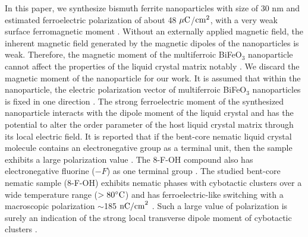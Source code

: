 \documentclass[reprint,amsfonts,amsmath,amssymb,aps,pre,floatfix,10pt]{revtex4-1}
\begin{document}
In this paper, we synthesize bismuth ferrite nanoparticles with size of 30 nm and estimated ferroelectric polarization of about 48 $\mu {\rm C}$/${\rm cm}^2$, with a very weak surface ferromagnetic moment \cite{castillo2013effect_20, Dhananjoy2023dielectric_21, selbach2007size_22, karpinsky2017thermodynamic_23}. Without an externally applied magnetic field, the inherent magnetic field generated by the magnetic dipoles of the nanoparticles is weak.  
Therefore, the magnetic moment of the multiferroic BiFeO$_3$ nanoparticle cannot affect the properties of the liquid crystal matrix notably \cite{reznikov2017ferromagnetic_24, emdadi2018behaviour_25, emdadi2018investigation_26}. We discard the magnetic moment of the nanoparticle for our work. It is assumed that within the nanoparticle, the electric polarization vector of multiferroic BiFeO$_3$ nanoparticles is fixed in one direction \cite{emdadi2018investigation_26}. The strong ferroelectric moment of the synthesized nanoparticle interacts with the dipole moment of the liquid crystal and has the potential to alter the order parameter of the host liquid crystal matrix through its local electric field.  It is reported that if the bent-core nematic liquid crystal molecule contains an electronegative group as a terminal unit, then the sample exhibits a large polarization value  \cite{mohiuddin2017observation_28,hiremath2016supramolecular_29}. The 8-F-OH compound also has electronegative fluorine ($-F$) as one terminal group \cite{zhang2022electric_27}. The studied bent-core nematic sample (8-F-OH) exhibits nematic phases with cybotactic clusters over a wide temperature range ($> 80 ^\circ {\rm C} $) and has ferroelectric-like switching with a macroscopic polarization $\sim$185 ${\rm nC/cm}^2$ \cite{zhang2022electric_27}. Such a large value of polarization is surely an indication of the strong local transverse dipole moment of cybotactic clusters \cite{ghosh2014ferroelectric_4, kumar2018nanodoping_12, vita2018polar_30}.
\end{document}
